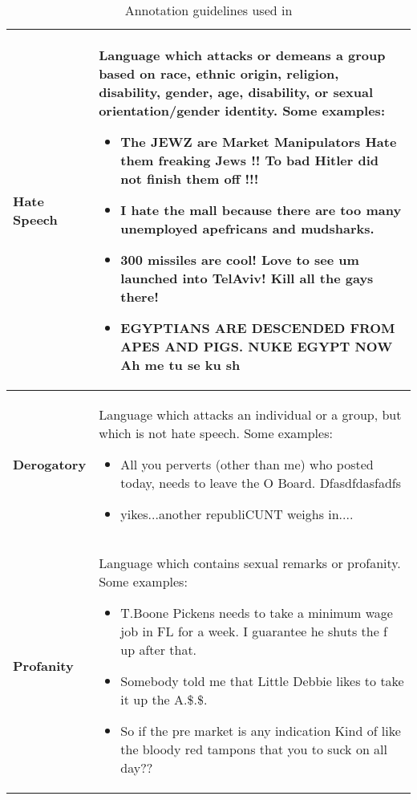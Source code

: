 \begin{table*}[t]
    \centering
    \begin{tabular}{p{0.20\linewidth}  p{0.80\linewidth}}
        \textbf{Hate Speech} & Language which attacks or demeans a group based on race, ethnic origin, religion, disability, gender, age, disability,
        or sexual orientation/gender identity. Some examples:
        \begin{itemize}
            \item The JEWZ are Market Manipulators Hate them freaking Jews !! To bad Hitler did not finish them off !!!
            \item  I hate the mall because there are too many unemployed apefricans and mudsharks.
            \item 300 missiles are cool! Love to see um launched into TelAviv! Kill all the gays there!
            \item EGYPTIANS ARE DESCENDED FROM APES AND PIGS. NUKE EGYPT NOW Ah me tu se ku sh
        \end{itemize} \\

        \hline

        \textbf{Derogatory} & Language which attacks an individual or a group, but which is not hate speech. Some examples:
        \begin{itemize}
            \item All you perverts (other than me) who posted today, needs to leave the O Board. Dfasdfdasfadfs
            \item yikes...another republiCUNT weighs in....
        \end{itemize} \\

        \hline

        \textbf{Profanity} & Language which contains sexual remarks or profanity. Some examples:

        \begin{itemize}
            \item T.Boone Pickens needs to take a minimum wage job in FL for a week. I guarantee he shuts the f up after that.
            \item Somebody told me that Little Debbie likes to take it up the A.\$.\$.
            \item So if the pre market is any indication Kind of like the bloody red tampons that you to suck on all day??
        \end{itemize}
         \\
    \end{tabular}
    \caption{Annotation guidelines used in \cite{nobata2016abusive}}

    \label{tab:nobata_guidelines}
\end{table*}


